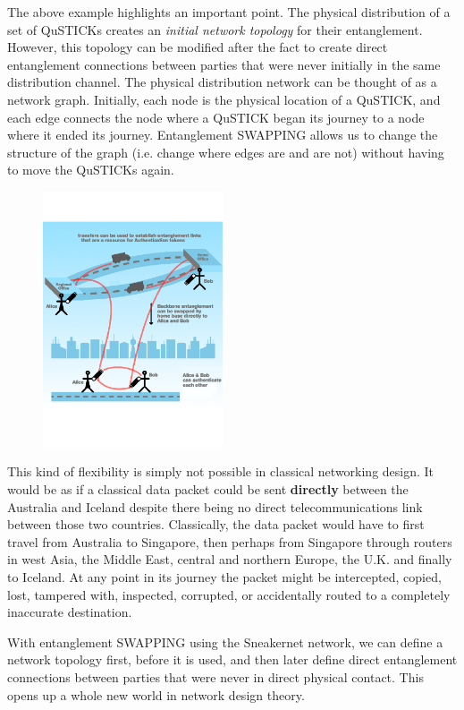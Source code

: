 \documentclass[twocolumn, aps, rmp, amsmath, amssymb, nofootinbib, superscriptaddress, longbibliography, floatfix, table-of-contents, eqsecnum]{revtex4-2}
\begin{document}
The above example highlights an important point. The physical distribution of a set of QuSTICKs creates an \textit{initial network topology} for their entanglement. However, this topology can be modified after the fact to create direct entanglement connections between parties that were never initially in the same distribution channel. The physical distribution network can be thought of as a network graph. Initially, each node is the physical location of a QuSTICK, and each edge connects the node where a QuSTICK began its journey to a node where it ended its journey. Entanglement SWAPPING allows us to change the structure of the graph (i.e. change where edges are and are not) without having to move the QuSTICKs again. 
 
\begin{figure}[htbp!]
	\includegraphics[clip=true, width=0.475\textwidth]{SWAPPING}
	\caption{}
	\label{fig:SWAPPING}
\end{figure}

This kind of flexibility is simply not possible in classical networking design. It would be as if a classical data packet could be sent \textbf{directly} between the Australia and Iceland despite there being no direct telecommunications link between those two countries. Classically, the data packet would have to first travel from Australia to Singapore, then perhaps from Singapore through routers in west Asia, the Middle East, central and northern Europe, the U.K. and finally to Iceland. At any point in its journey the packet might be intercepted, copied, lost, tampered with, inspected, corrupted, or accidentally routed to a completely inaccurate destination. 

With entanglement SWAPPING using the Sneakernet network, we can define a network topology first, before it is used, and then later define direct entanglement connections between parties that were never in direct physical contact. This opens up a whole new world in network design theory. 
\end{document}
